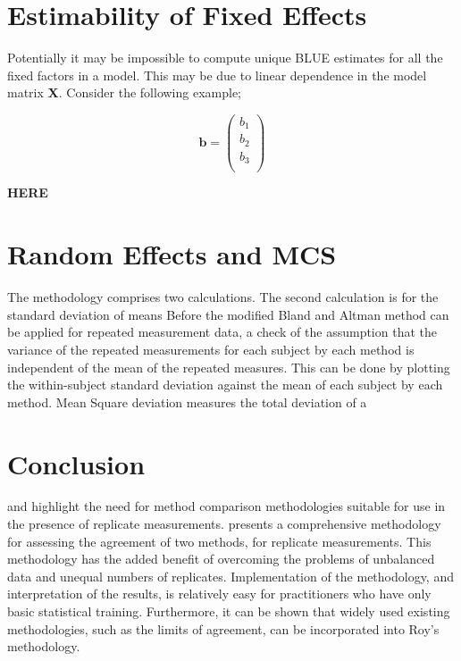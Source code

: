 \documentclass[12pt, a4paper]{report}
\theoremstyle{plain}
\theoremstyle{definition}
\theoremstyle{remark}
\begin{document}
\section{Estimability of Fixed Effects}
Potentially it may be impossible to compute unique BLUE estimates for all the fixed factors in a model. This may be due to linear dependence in the model
matrix \textbf{X}. Consider the following example;


\begin{equation}
\textbf{b}= \left( \begin{array}{c}
b_{1} \\
b_{2} \\
b_{3} \\
\end{array}  \right)
\end{equation}

\textbf{HERE}









\section{Random Effects and MCS}
The methodology comprises two calculations. The second calculation
is for the standard deviation of means Before the modified Bland
and Altman method can be applied for repeated measurement data, a
check of the assumption that the variance of the repeated
measurements for each subject by each method is independent of the
mean of the repeated measures. This can be done by plotting the
within-subject standard deviation against the mean of each subject
by each method. Mean Square deviation measures the total deviation
of a




\section{Conclusion}
\citet{BXC2008} and \citet{roy} highlight the need for method comparison methodologies suitable for use in the presence of replicate measurements. \citet{roy} presents a comprehensive methodology for assessing the agreement of two methods, for replicate measurements. This methodology has the added benefit of overcoming the problems of unbalanced data and unequal numbers of replicates. Implementation of the methodology, and interpretation of the results, is relatively easy for practitioners who have only basic statistical training. Furthermore, it can be shown that widely used existing methodologies, such as the limits of agreement, can be incorporated into Roy's methodology.
\end{document}
